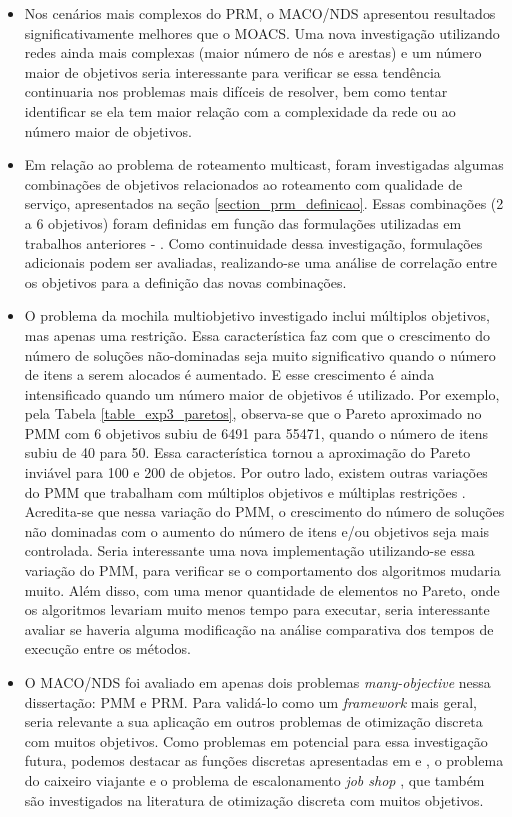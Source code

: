 \begin{itemize}
	\item Nos cenários mais complexos do PRM, o MACO/NDS apresentou resultados significativamente melhores que o MOACS. Uma nova investigação utilizando redes ainda mais complexas (maior número de nós e arestas) e um número maior de objetivos seria interessante para verificar se essa tendência continuaria nos problemas mais difíceis de resolver, bem como tentar identificar se ela tem maior relação com a complexidade da rede ou ao número maior de objetivos.
	
	\item Em relação ao problema de roteamento multicast, foram investigadas algumas combinações de objetivos relacionados ao roteamento com qualidade de serviço, apresentados na seção \ref{section_prm_definicao}. Essas combinações (2 a 6 objetivos) foram definidas em função das formulações utilizadas em trabalhos anteriores - . Como continuidade dessa investigação, formulações adicionais podem ser avaliadas, realizando-se uma análise de correlação entre os objetivos para a definição das novas combinações.

	\item O problema da mochila multiobjetivo investigado inclui múltiplos objetivos, mas apenas uma restrição. Essa característica faz com que o crescimento do número de soluções não-dominadas seja muito significativo quando o número de itens a serem alocados é aumentado. E esse crescimento é ainda intensificado quando um número maior de objetivos é utilizado. Por exemplo, pela Tabela \ref{table_exp3_paretos}, observa-se  que o Pareto aproximado no PMM com 6 objetivos subiu de 6491 para 55471, quando o número de itens subiu de 40 para 50. Essa característica tornou a aproximação do Pareto inviável para 100 e 200 de objetos. Por outro lado, existem outras variações do PMM que trabalham com múltiplos objetivos e múltiplas restrições \cite{Ishibuchi2015,Alaya2007}. Acredita-se que nessa variação do PMM, o crescimento do número de soluções não dominadas com o aumento do número de itens e/ou objetivos seja mais controlada. Seria interessante uma nova implementação utilizando-se essa variação do PMM, para verificar se o comportamento dos algoritmos mudaria muito. Além disso, com uma menor quantidade de elementos no Pareto, onde os algoritmos levariam muito menos tempo para executar, seria interessante avaliar se haveria alguma modificação na análise comparativa dos tempos de execução entre os métodos.
	
	\item O MACO/NDS foi avaliado em apenas dois problemas \textit{many-objective} nessa dissertação: PMM e PRM. Para validá-lo como um \textit{framework} mais geral, seria relevante a sua aplicação em outros problemas de otimização discreta com muitos objetivos. Como problemas em potencial para essa investigação futura, podemos destacar as funções discretas apresentadas em \cite{DiscreteFunctions1} e  \cite{DiscreteFunctions2}, o problema do caixeiro viajante \cite{Riveros2016} e o problema de escalonamento \textit{job shop} \cite{JobShop}, que também são investigados na literatura de otimização discreta com muitos objetivos.
	

\end{itemize}
